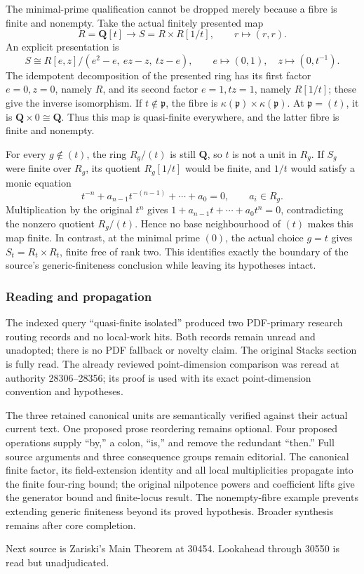 The minimal-prime qualification cannot be dropped merely because a fibre is finite and nonempty. Take the actual finitely presented map \[
 R=\mathbf Q[t]\longrightarrow
 S=R\times R[1/t],\qquad r\longmapsto(r,r).
\] An explicit presentation is \[
 S\cong R[e,z]/(e^2-e,\ ez-z,\ tz-e),
 \qquad e\longmapsto(0,1),\quad z\longmapsto(0,t^{-1}).
\] The idempotent decomposition of the presented ring has its first factor \(e=0,z=0\), namely \(R\), and its second factor \(e=1,tz=1\), namely \(R[1/t]\); these give the inverse isomorphism. If \(t\notin\mathfrak p\), the fibre is \(\kappa(\mathfrak p)\times\kappa(\mathfrak p)\). At \(\mathfrak p=(t)\), it is \(\mathbf Q\times0\cong\mathbf Q\). Thus this map is quasi-finite everywhere, and the latter fibre is finite and nonempty.

For every \(g\notin(t)\), the ring \(R_g/(t)\) is still \(\mathbf Q\), so \(t\) is not a unit in \(R_g\). If \(S_g\) were finite over \(R_g\), its quotient \(R_g[1/t]\) would be finite, and \(1/t\) would satisfy a monic equation \[
 t^{-n}+a_{n-1}t^{-(n-1)}+\cdots+a_0=0,\qquad a_i\in R_g.
\] Multiplication by the original \(t^n\) gives \(1+a_{n-1}t+\cdots+a_0t^n=0\), contradicting the nonzero quotient \(R_g/(t)\). Hence no base neighbourhood of \((t)\) makes this map finite. In contrast, at the minimal prime \((0)\), the actual choice \(g=t\) gives \(S_t=R_t\times R_t\), finite free of rank two. This identifies exactly the boundary of the source's generic-finiteness conclusion while leaving its hypotheses intact.

\subsubsection{Reading and propagation}\label{reading-and-propagation}

The indexed query ``quasi-finite isolated'' produced two PDF-primary research routing records and no local-work hits. Both records remain unread and unadopted; there is no PDF fallback or novelty claim. The original Stacks section is fully read. The already reviewed point-dimension comparison was reread at authority 28306--28356; its proof is used with its exact point-dimension convention and hypotheses.

The three retained canonical units are semantically verified against their actual current text. One proposed prose reordering remains optional. Four proposed operations supply ``by,'' a colon, ``is,'' and remove the redundant ``then.'' Full source arguments and three consequence groups remain editorial. The canonical finite factor, its field-extension identity and all local multiplicities propagate into the finite four-ring bound; the original nilpotence powers and coefficient lifts give the generator bound and finite-locus result. The nonempty-fibre example prevents extending generic finiteness beyond its proved hypothesis. Broader synthesis remains after core completion.

Next source is Zariski's Main Theorem at 30454. Lookahead through 30550 is read but unadjudicated.
